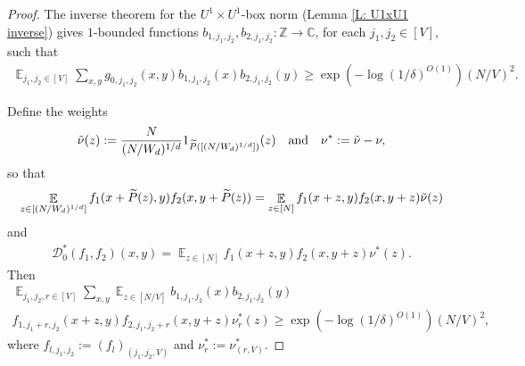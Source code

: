 \documentclass[11pt]{amsart}
\theoremstyle{definition}
\DeclareMathOperator*{\E}{\mathbb{E}}
\newcommand{\CD}{{\mathcal D}}
\begin{document}
\begin{proof}
The inverse theorem for the $U^1 \times U^1$-box norm (Lemma \ref{L: U1xU1 inverse}) gives $1$-bounded functions $b_{1, j_1, j_2},b_{2, j_1, j_2}: \mathbb{Z} \to \mathbb{C}$, for each $j_1, j_2\in [V]$, such that
\begin{align*}
    \E_{j_1, j_2\in[V]}\sum_{x,y}g_{0, j_1, j_2}(x,y)b_{1, j_1, j_2}(x)b_{2, j_1, j_2}(y)\geq \exp(-\log(1/\delta)^{O(1)})(N/V)^2.
\end{align*}

Define the weights
\begin{align*}
    \tilde{\nu}(z):= \frac{N}{(N/W_d)^{1/d}}1_{\widetilde P([(N/W_d)^{1/d}])}(z)\quad\textrm{and}\quad \nu^*: = \Tilde{\nu}-\nu,
\end{align*}
so that
\begin{align*}
    \E_{z\in[(N/W_d)^{1/d}]}f_1(x + \widetilde P(z), y)f_2(x, y + \widetilde P(z)) = \E_{z\in[N]} f_1(x+z, y) f_2(x, y+z)\Tilde{\nu}(z)
\end{align*}
and
\begin{align*}
    \CD_0^*(f_1, f_2)(x,y) = \E_{z\in[N]} f_1(x+z, y) f_2(x, y+z)\nu^*(z).
\end{align*}
Then
\begin{multline*}
    \E_{j_1,j_2,r\in[V]}\sum_{x,y}\E_{z\in[N/V]}b_{1,j_1,j_2}(x)b_{2,j_1,j_2}(y)\\
    f_{1, j_1 + r, j_2}(x+z,y)f_{2,j_1,j_2+r}(x,y+z)\nu^*_r(z)\geq \exp(-\log(1/\delta)^{O(1)})(N/V)^2, 
\end{multline*}
where $f_{l,j_1,j_2} :=(f_l)_{(j_1,j_2, V)}$ and $\nu^*_r := \nu^*_{(r,V)}$.


\end{proof}
\end{document}
